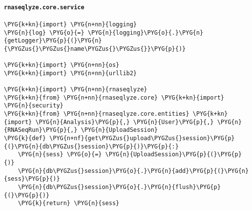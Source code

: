 \paragraph{\texttt{rnaseqlyze.core.service}}
\label{index-pdf4:rnaseqlyze-core-service}
\begin{Verbatim}[commandchars=\\\{\}]
\PYG{k+kn}{import} \PYG{n+nn}{logging}
\PYG{n}{log} \PYG{o}{=} \PYG{n}{logging}\PYG{o}{.}\PYG{n}{getLogger}\PYG{p}{(}\PYG{n}{\PYGZus{}\PYGZus{}name\PYGZus{}\PYGZus{}}\PYG{p}{)}

\PYG{k+kn}{import} \PYG{n+nn}{os}
\PYG{k+kn}{import} \PYG{n+nn}{urllib2}

\PYG{k+kn}{import} \PYG{n+nn}{rnaseqlyze}
\PYG{k+kn}{from} \PYG{n+nn}{rnaseqlyze.core} \PYG{k+kn}{import} \PYG{n}{security}
\PYG{k+kn}{from} \PYG{n+nn}{rnaseqlyze.core.entities} \PYG{k+kn}{import} \PYG{n}{Analysis}\PYG{p}{,} \PYG{n}{User}\PYG{p}{,} \PYG{n}{RNASeqRun}\PYG{p}{,} \PYG{n}{UploadSession}
\PYG{k}{def} \PYG{n+nf}{get\PYGZus{}upload\PYGZus{}session}\PYG{p}{(}\PYG{n}{db\PYGZus{}session}\PYG{p}{)}\PYG{p}{:}
    \PYG{n}{sess} \PYG{o}{=} \PYG{n}{UploadSession}\PYG{p}{(}\PYG{p}{)}
    \PYG{n}{db\PYGZus{}session}\PYG{o}{.}\PYG{n}{add}\PYG{p}{(}\PYG{n}{sess}\PYG{p}{)}
    \PYG{n}{db\PYGZus{}session}\PYG{o}{.}\PYG{n}{flush}\PYG{p}{(}\PYG{p}{)}
    \PYG{k}{return} \PYG{n}{sess}


\end{Verbatim}

